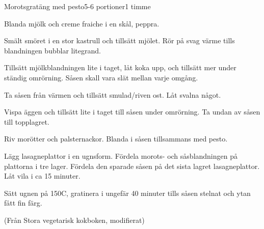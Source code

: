 \documentclass[a4wide, 10pt]{article}
\begin{document}
\begin{recipe}{Morotsgratäng med pesto}{5-6 portioner}{1 timme}


Blanda mjölk och creme fraiche i en skål, peppra.


Smält smöret i en stor kastrull och tillsätt mjölet. Rör på svag värme
tills blandningen bubblar litegrand.

Tillsätt mjölkblandningen lite i taget, låt koka upp, och tillsätt mer
under ständig omrörning. Såsen skall vara slät mellan varje omgång.


Ta såsen från värmen och tillsätt smulad/riven ost. Låt svalna något.

Vispa äggen och tillsätt lite i taget till såsen under omrörning. Ta
undan  av såsen till topplagret.


Riv morötter och palsternackor. Blanda i såsen tillsammans med pesto.


Lägg lasagneplattor i en ugnsform. Fördela morots- och såsblandningen
på plattorna i tre lager. Fördela den sparade såsen på det sista
lagret lasagneplattor. Låt vila i ca 15 minuter.

Sätt ugnen på 150\0C, gratinera i ungefär 40 minuter tills såsen
stelnat och ytan fått fin färg.
\end{recipe}

(Från Stora vegetarisk kokboken, modifierat)
\end{document}
